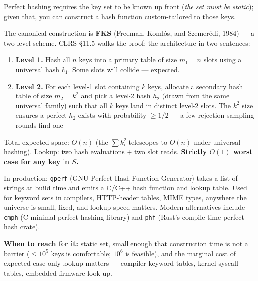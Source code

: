 \documentclass[11pt]{article}
\begin{document}
Perfect hashing requires the key set to be known up front (\emph{the
set must be static}); given that, you can construct a hash function
custom-tailored to those keys.

The canonical construction is \textbf{FKS} (Fredman, Komlós, and
Szemerédi, 1984) --- a two-level scheme. CLRS \S11.5 walks the
proof; the architecture in two sentences:

\begin{enumerate}[leftmargin=*]
    \item \textbf{Level 1.} Hash all $n$ keys into a primary table
          of size $m_1 = n$ slots using a universal hash $h_1$.
          Some slots will collide --- expected.
    \item \textbf{Level 2.} For each level-1 slot containing $k$
          keys, allocate a secondary hash table of size $m_2 = k^2$
          and pick a level-2 hash $h_2$ (drawn from the same
          universal family) such that all $k$ keys land in
          distinct level-2 slots. The $k^2$ size ensures a perfect
          $h_2$ exists with probability $\ge 1/2$ --- a few
          rejection-sampling rounds find one.
\end{enumerate}

Total expected space: $O(n)$ (the $\sum k_i^2$ telescopes to $O(n)$
under universal hashing). Lookup: two hash evaluations + two slot
reads. \textbf{Strictly $O(1)$ worst case for any key in $S$.}

In production: \texttt{gperf} (GNU Perfect Hash Function Generator)
takes a list of strings at build time and emits a C/C++ hash
function and lookup table. Used for keyword sets in compilers,
HTTP-header tables, MIME types, anywhere the universe is small,
fixed, and lookup speed matters. Modern alternatives include
\texttt{cmph} (C minimal perfect hashing library) and
\texttt{phf} (Rust's compile-time perfect-hash crate).

\textbf{When to reach for it:} static set, small enough that
construction time is not a barrier ($\le 10^5$ keys is comfortable;
$10^6$ is feasible), and the marginal cost of expected-case-only
lookup matters --- compiler keyword tables, kernel syscall tables,
embedded firmware look-up.
\end{document}
